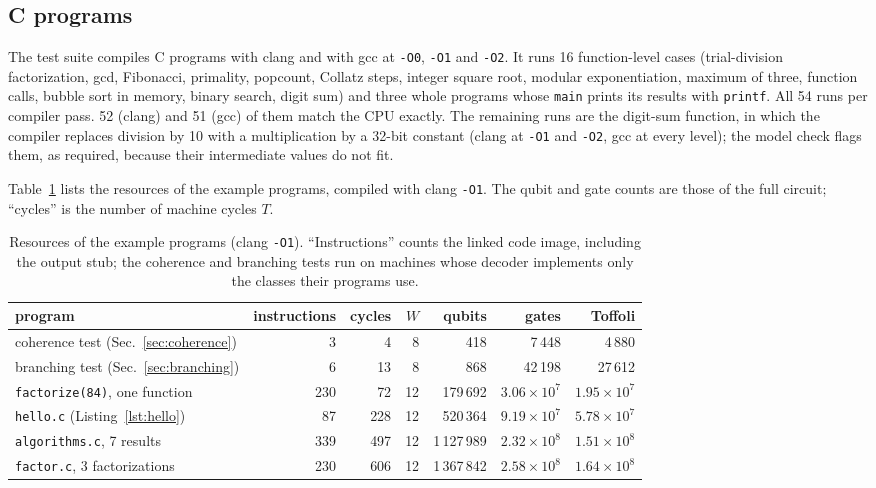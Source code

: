 \documentclass[11pt]{article}
\begin{document}
\subsection{C programs}

The test suite compiles C programs with clang and with gcc at \texttt{-O0}, \texttt{-O1} and
\texttt{-O2}. It runs 16 function-level cases (trial-division factorization, gcd, Fibonacci,
primality, popcount, Collatz steps, integer square root, modular exponentiation, maximum of
three, function calls, bubble sort in memory, binary search, digit sum) and three whole
programs whose \texttt{main} prints its results with \texttt{printf}. All 54 runs per compiler
pass. 52 (clang) and 51 (gcc) of them match the CPU exactly. The remaining runs are the digit-sum
function, in which the compiler replaces division by 10 with a multiplication by a 32-bit constant
(clang at \texttt{-O1} and \texttt{-O2}, gcc at every level); the model check flags them, as
required, because their intermediate values do not fit.

Table~\ref{tab:res} lists the resources of the example programs, compiled with clang
\texttt{-O1}. The qubit and gate counts are those of the full circuit; ``cycles'' is the number
of machine cycles $T$.

\begin{table}[H]
\centering
\small
\begin{tabular}{@{}lrrrrrr@{}}
\toprule
program & instructions & cycles & $W$ & qubits & gates & Toffoli \\
\midrule
coherence test (Sec.~\ref{sec:coherence}) & 3 & 4 & 8 & 418 & 7\,448 & 4\,880 \\
branching test (Sec.~\ref{sec:branching}) & 6 & 13 & 8 & 868 & 42\,198 & 27\,612 \\
\texttt{factorize(84)}, one function & 230 & 72 & 12 & 179\,692 & $3.06\times10^{7}$ & $1.95\times10^{7}$ \\
\texttt{hello.c} (Listing~\ref{lst:hello}) & 87 & 228 & 12 & 520\,364 & $9.19\times10^{7}$ & $5.78\times10^{7}$ \\
\texttt{algorithms.c}, 7 results & 339 & 497 & 12 & 1\,127\,989 & $2.32\times10^{8}$ & $1.51\times10^{8}$ \\
\texttt{factor.c}, 3 factorizations & 230 & 606 & 12 & 1\,367\,842 & $2.58\times10^{8}$ & $1.64\times10^{8}$ \\
\bottomrule
\end{tabular}
\caption{Resources of the example programs (clang \texttt{-O1}). ``Instructions'' counts the
linked code image, including the output stub; the coherence and branching tests run on machines
whose decoder implements only the classes their programs use.}
\label{tab:res}
\end{table}
\end{document}
